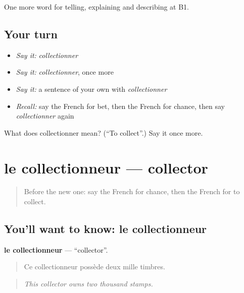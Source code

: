 \begin{grammarlens}[title={What you've built}]
One more word for telling, explaining and describing at B1.
\end{grammarlens}

\subsection*{Your turn}
\begin{itemize}
\raggedright
  \item \emph{Say it:} \emph{collectionner}
  \item \emph{Say it:} \emph{collectionner}, once more
  \item \emph{Say it:} a sentence of your own with \emph{collectionner}
  \item \emph{Recall:} say the French for bet, then the French for chance, then say \emph{collectionner} again
\end{itemize}

\begin{tcolorbox}[breakable,colback=teal!4,colframe=teal!35!black,title={Before you move on}]
What does collectionner mean? (\textquotedblleft{}To collect\textquotedblright{}.) Say it once more.
\end{tcolorbox}
\section[le collectionneur]{le collectionneur — collector}

\label{lesson:FR-C501-collectionneur}



\begin{quote}
Before the new one: say the French for chance, then the French for to collect.
\end{quote}

\subsection*{You'll want to know: le collectionneur}
\textbf{le collectionneur} — \textquotedblleft{}collector\textquotedblright{}.

\begin{quote}
Ce collectionneur possède deux mille timbres.
\end{quote}

\begin{quote}
\emph{This collector owns two thousand stamps.}
\end{quote}

